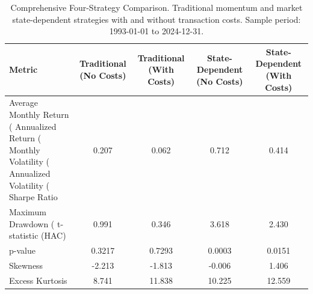 \begin{table}
\caption{Comprehensive Four-Strategy Comparison. Traditional momentum and market state-dependent strategies with and without transaction costs. Sample period: 1993-01-01 to 2024-12-31.}
\label{tab:four_strategy_comparison}
\begin{tabular}{l|cc|cc}
\toprule
Metric & Traditional (No Costs) & Traditional (With Costs) & State-Dependent (No Costs) & State-Dependent (With Costs) \\
\midrule
Average Monthly Return (%
Annualized Return (%
Monthly Volatility (%
Annualized Volatility (%
Sharpe Ratio & 0.207 & 0.062 & 0.712 & 0.414 \\
Maximum Drawdown (%
t-statistic (HAC) & 0.991 & 0.346 & 3.618 & 2.430 \\
p-value & 0.3217 & 0.7293 & 0.0003 & 0.0151 \\
Skewness & -2.213 & -1.813 & -0.006 & 1.406 \\
Excess Kurtosis & 8.741 & 11.838 & 10.225 & 12.559 \\
\bottomrule
\end{tabular}
\end{table}
